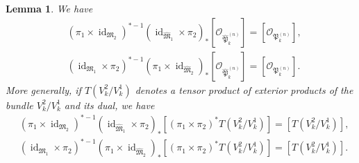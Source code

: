 \documentclass[12pt]{amsart}
\def\frak{\mathfrak}
\newtheorem{Lemma}[equation]{Lemma}
\theoremstyle{definition}
\theoremstyle{remark}
\numberwithin{equation}{subsection}
\newcommand{\id}{\operatorname{id}}
\newcommand{\M}{{\frak M}} %
\newcommand{\Pa}{{\frak P}} %
\newcommand{\shfO}{\mathcal O}
\newcommand{\Mpp}{\widehat\M}
\begin{document}
\begin{Lemma}\label{lem:pushforwardPHecke}
We have
\begin{equation*}
\begin{split}
 & (\pi_1\times\id_{\M_2})^{*-1}
  \left(\id_{\Mpp_1}\times\pi_2\right)_*
  [\shfO_{\widehat\Pa_k^{(n)}}]
  = [\shfO_{\Pa_k^{(n)}}], \\
 & (\id_{\M_1}\times\pi_2)^{*-1}
  \left(\pi_1\times\id_{\Mpp_2}\right)_*
  [\shfO_{\widehat\Pa_k^{(n)}}]
  = [\shfO_{\Pa_k^{(n)}}].
\end{split}
\end{equation*}
More generally, if $T(V^2_k/V^1_k)$ denotes a tensor product of
exterior products of the bundle $V^2_k/V^1_k$ and its dual, we have
\begin{equation*}
\begin{split}
 & (\pi_1\times\id_{\M_2})^{*-1}
  \left(\id_{\Mpp_1}\times\pi_2\right)_*
  [(\pi_1\times\pi_2)^* T\left( V^2_k/V^1_k\right)]
  = [T\left( V^2_k/V^1_k\right)], \\
 & (\id_{\M_1}\times\pi_2)^{*-1}
  \left(\pi_1\times\id_{\Mpp_2}\right)_*
  [(\pi_1\times\pi_2)^* T\left(V^2_k/V^1_k\right)]
  = [T\left(V^2_k/V^1_k\right)].
\end{split}
\end{equation*}
\end{Lemma}
\end{document}
